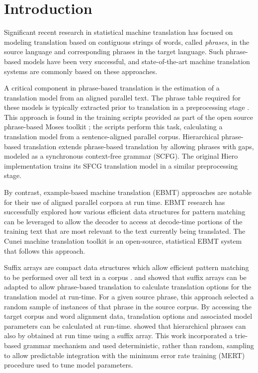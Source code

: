 \documentclass{pbml}
\newcommand{\newcite}{\namecite}
\begin{document}

\section{Introduction}

Significant recent research in statistical machine translation has focused on modeling translation based on contiguous strings of words, called {\it phrases}, in the source language and corresponding phrases in the target language. Such phrase-based models \cite{Koehn2003,Marcu2002,Och2004,Och1999} have been very successful, and state-of-the-art machine translation systems are commonly based on these approaches.

A critical component in phrase-based translation is the estimation of a translation model from an aligned parallel text. The phrase table required for these models is typically extracted prior to translation in a preprocessing stage \cite{Koehn2003,Kumar2006}. This approach is found in the training scripts provided as part of the open source phrase-based Moses toolkit \cite{Moses}; the scripts perform this task, calculating a translation model from a sentence-aligned parallel corpus. Hierarchical phrase-based translation \cite{Chiang2005} extends phrase-based translation by allowing phrases with gaps, modeled as a synchronous context-free grammar (SCFG). The original Hiero implementation \cite{Chiang2007} trains its SFCG translation model in a similar preprocessing stage.

By contrast, example-based machine translation (EBMT) approaches \cite{Nagao1981,Sato1990,Somers2003} are notable for their use of aligned parallel corpora at run time. EBMT research has successfully explored how various efficient data structures for pattern matching can be leveraged to allow the decoder to access at decode-time portions of the training text that are most relevant to the text currently being translated. The Cunei machine translation toolkit \cite{Phillips2009} is an open-source, statistical EBMT system that follows this approach.
 
Suffix arrays are compact data structures which allow efficient pattern matching to be performed over all text in a corpus \cite{Manber1990}.  \newcite{Callison-Burch2005b} and \newcite{Zhang2005} showed that suffix arrays can be adapted to allow phrase-based translation to calculate translation options for the translation model at run-time. For a given source phrase, this approach selected a random sample of instances of that phrase in the source corpus. By accessing the target corpus and word alignment data, translation options and associated model parameters can be calculated at run-time. \newcite{Lopez2007} showed that hierarchical phrases can also by obtained at run time using a suffix array. This work incorporated a trie-based grammar mechanism \cite{Fredkin1960} and used deterministic, rather than random, sampling to allow predictable integration with the minimum error rate training (MERT) procedure \cite{Och2003c} used to tune model parameters.
\end{document}
